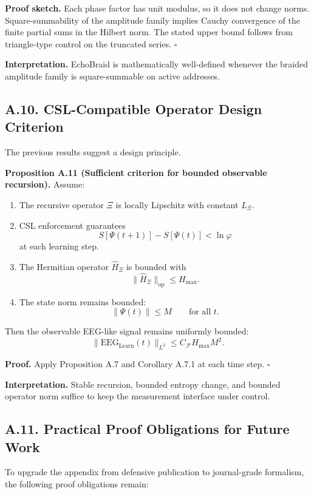 \documentclass[11pt]{article}
\begin{document}
\textbf{Proof sketch.}
Each phase factor has unit modulus, so it does not change norms. Square-summability of the amplitude family implies Cauchy convergence of the finite partial sums in the Hilbert norm. The stated upper bound follows from triangle-type control on the truncated series. \hfill $\square$

\textbf{Interpretation.}
EchoBraid is mathematically well-defined whenever the braided amplitude family is square-summable on active addresses.

\subsection*{A.10. CSL-Compatible Operator Design Criterion}

The previous results suggest a design principle.

\textbf{Proposition A.11 (Sufficient criterion for bounded observable recursion).}
Assume:

\begin{enumerate}
  \item The recursive operator $\Xi$ is locally Lipschitz with constant $L_\Xi$.
  \item CSL enforcement guarantees
  \[
  S[\Psi(t+1)]-S[\Psi(t)] < \ln\varphi
  \]
  at each learning step.
  \item The Hermitian operator $\hat{H}_\Xi$ is bounded with
  \[
  \|\hat{H}_\Xi\|_{\mathrm{op}} \le H_{\max}.
  \]
  \item The state norm remains bounded:
  \[
  \|\Psi(t)\| \le M
  \qquad \text{for all } t.
  \]
\end{enumerate}

Then the observable EEG-like signal remains uniformly bounded:
\[
\|\mathrm{EEG}_{\mathrm{Learn}}(t)\|_{L^2}
\le
C_{\mathcal{F}} H_{\max} M^2.
\]

\textbf{Proof.}
Apply Proposition A.7 and Corollary A.7.1 at each time step. \hfill $\square$

\textbf{Interpretation.}
Stable recursion, bounded entropy change, and bounded operator norm suffice to keep the measurement interface under control.

\subsection*{A.11. Practical Proof Obligations for Future Work}

To upgrade the appendix from defensive publication to journal-grade formalism, the following proof obligations remain:
\end{document}
